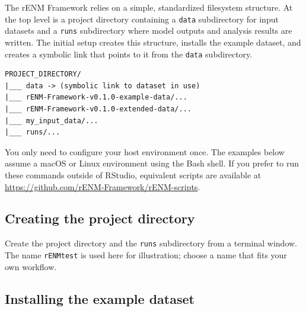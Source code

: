 \documentclass[
  letterpaper,
  DIV=11,
  numbers=noendperiod]{scrartcl}
\newenvironment{Shaded}{\begin{snugshade}}{\end{snugshade}}
\newcommand{\AttributeTok}[1]{\textcolor[rgb]{0.40,0.45,0.13}{#1}}
\newcommand{\CommentTok}[1]{\textcolor[rgb]{0.37,0.37,0.37}{#1}}
\newcommand{\FunctionTok}[1]{\textcolor[rgb]{0.28,0.35,0.67}{#1}}
\newcommand{\OperatorTok}[1]{\textcolor[rgb]{0.37,0.37,0.37}{#1}}
\newcommand{\StringTok}[1]{\textcolor[rgb]{0.13,0.47,0.30}{#1}}
\newcommand{\VariableTok}[1]{\textcolor[rgb]{0.07,0.07,0.07}{#1}}
\begin{document}
The rENM Framework relies on a simple, standardized filesystem
structure. At the top level is a project directory containing a
\texttt{data} subdirectory for input datasets and a \texttt{runs}
subdirectory where model outputs and analysis results are written. The
initial setup creates this structure, installs the example dataset, and
creates a symbolic link that points to it from the \texttt{data}
subdirectory.

\begin{verbatim}
PROJECT_DIRECTORY/
|___ data -> (symbolic link to dataset in use)
|___ rENM-Framework-v0.1.0-example-data/...
|___ rENM-Framework-v0.1.0-extended-data/...
|___ my_input_data/...
|___ runs/...
\end{verbatim}

You only need to configure your host environment once. The examples
below assume a macOS or Linux environment using the Bash shell. If you
prefer to run these commands outside of RStudio, equivalent scripts are
available at \url{https://github.com/rENM-Framework/rENM-scripts}.

\subsection{Creating the project
directory}\label{creating-the-project-directory}

Create the project directory and the \texttt{runs} subdirectory from a
terminal window. The name \texttt{rENMtest} is used here for
illustration; choose a name that fits your own workflow.

\begin{Shaded}
\end{Shaded}

\subsection{Installing the example
dataset}\label{installing-the-example-dataset}
\end{document}
